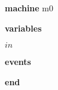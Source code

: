 \begin{block}
  \item   \textbf{machine} m0
  \item   \textbf{variables}
  \begin{block}
    \item   $in$
  \end{block}
  \item   
  \item   
  \item   \textbf{events}
  \begin{block}
    \item   
    \item   
  \end{block}
  \item   \textbf{end} \\
\end{block}
